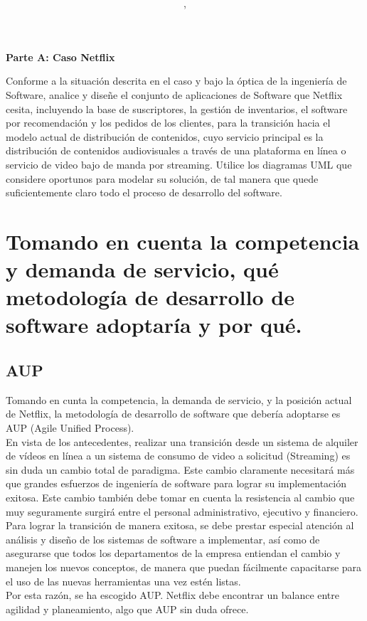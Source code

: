 \documentclass{article}
\author{\nombre , \carnet}
\title{\textbf{\Huge\titulo}}
\newcommand*\rbreak{\par\noindent\linebreak}
\begin{document}
\maketitle
\textbf{\huge{Parte A: Caso Netflix}}\rbreak
Conforme a la situación descrita en el caso y bajo
la óptica de la ingeniería de Software, analice y
diseñe el conjunto de aplicaciones de Software
que Netflix cesita, incluyendo la base de 
suscriptores, la gestión de inventarios, el software
por recomendación y los pedidos de los
clientes, para la transición hacia el modelo actual de
distribución de contenidos, cuyo servicio principal
es la distribución de contenidos audiovisuales
a través de una plataforma en línea o 
servicio de video bajo de manda por streaming. Utilice
los diagramas UML que considere oportunos para
modelar su solución, de tal manera que quede 
suficientemente claro todo el proceso de desarrollo
del software.
\section{Tomando en cuenta la competencia y demanda de servicio,
      qué metodología de desarrollo de software adoptaría
      y por qué.}
\subsection{AUP}
Tomando en cunta la competencia, la demanda de servicio, y la 
posición actual de Netflix, la metodología de desarrollo de software 
que debería adoptarse es AUP (Agile Unified Process). \\
En vista de los antecedentes, realizar una transición 
desde un sistema de alquiler de vídeos en línea a un sistema de
consumo de video a solicitud (Streaming) es sin duda un cambio total
de paradigma. Este cambio claramente necesitará más que grandes 
esfuerzos de ingeniería de software para lograr su implementación
exitosa.  Este cambio también debe tomar en cuenta la resistencia
al cambio que muy seguramente surgirá entre el personal
administrativo, ejecutivo y financiero. Para lograr la transición
de manera exitosa, se debe prestar especial atención al análisis
y diseño de los sistemas de software a implementar, así como de 
asegurarse que todos los departamentos de la empresa entiendan
el cambio y manejen los nuevos conceptos, de manera que 
puedan fácilmente capacitarse para el uso de las nuevas
herramientas una vez estén listas. \\
Por esta razón, se ha escogido AUP. Netflix debe encontrar un 
balance entre agilidad y planeamiento, algo que AUP sin duda ofrece.
\end{document}
